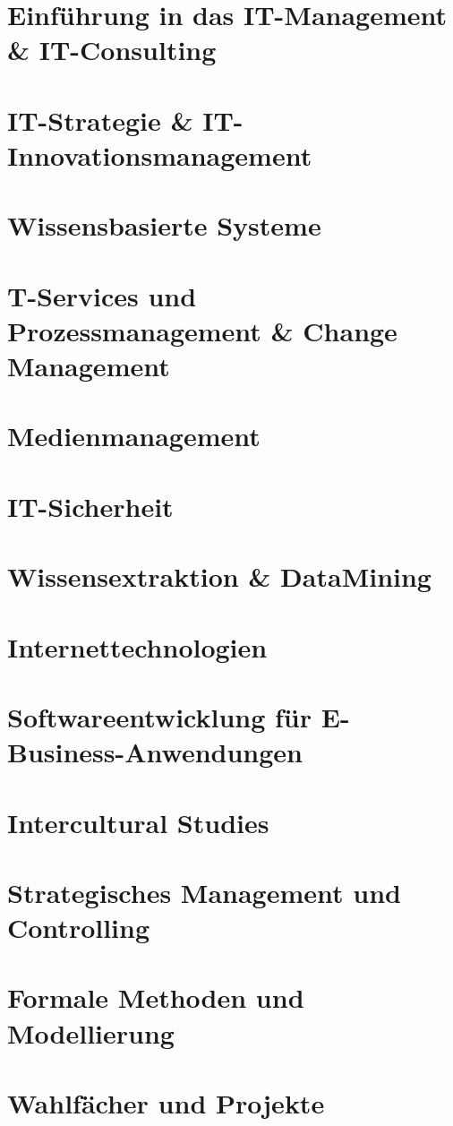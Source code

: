 \documentclass{hswbook}
\begin{document}
    \chapter{Einführung in das IT-Management \& IT-Consulting}
    \chapter{IT-Strategie \& IT-Innovationsmanagement }
    \chapter{Wissensbasierte Systeme}
    \chapter{T-Services und Prozessmanagement \& Change Management}
    \chapter{Medienmanagement}
    \chapter{IT-Sicherheit}
    \chapter{Wissensextraktion \& DataMining}
    \chapter{Internettechnologien}
    \chapter{Softwareentwicklung für E-Business-Anwendungen}
    \chapter{Intercultural Studies}
    \chapter{Strategisches Management und Controlling}
    \chapter{Formale Methoden und Modellierung}
    \chapter{Wahlfächer und Projekte}
\end{document}
